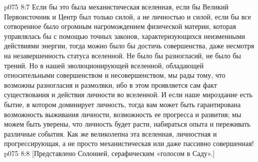 \vs p075 8:7 Если бы это была механистическая вселенная, если бы Великий Первоисточник и Центр был только силой, а не личностью и силой, если бы все сотворенное было огромным нагромождением физической материи, которая управлялась бы с помощью точных законов, характеризующихся неизменными действиями энергии, тогда можно было бы достичь совершенства, даже несмотря на незавершенность статуса вселенной. Не было бы разногласий, не было бы трений. Но в нашей эволюционирующей вселенной, обладающей относительными совершенством и несовершенством, мы рады тому, что возможны разногласия и размолвки, ибо в этом проявляется сам факт существования и действия личности во вселенной. И если наше мироздание есть бытие, в котором доминирует личность, тогда вам может быть гарантирована возможность выживания личности, возможность ее прогресса и развития; мы можем быть уверены, что личность будет расти, набираться опыта и переживать различные события. Как же великолепна эта вселенная, личностная и прогрессирующая, а не просто механистическая или даже пассивно совершенная!
\vsetoff
\vs p075 8:8 [Представлено Солонией, серафическим «голосом в Саду».]
